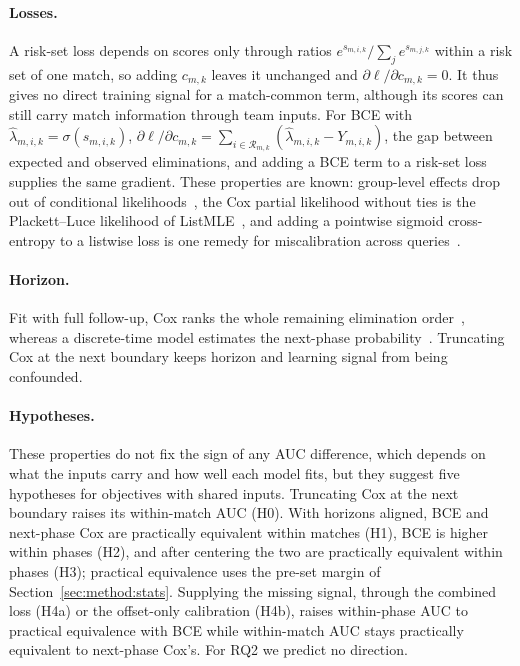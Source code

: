 \documentclass[sigconf,anonymous]{acmart}
\begin{document}
\paragraph{Losses.}
A risk-set loss depends on scores only through ratios $e^{s_{m,i,k}}/\sum_{j}e^{s_{m,j,k}}$ within a risk set of one match, so adding $c_{m,k}$ leaves it unchanged and $\partial\ell/\partial c_{m,k}=0$. It thus gives no direct training signal for a match-common term, although its scores can still carry match information through team inputs. For BCE with $\hat\lambda_{m,i,k}=\sigma(s_{m,i,k})$, $\partial\ell/\partial c_{m,k}=\sum_{i\in\mathcal{R}_{m,k}}(\hat\lambda_{m,i,k}-Y_{m,i,k})$, the gap between expected and observed eliminations, and adding a BCE term to a risk-set loss supplies the same gradient. These properties are known: group-level effects drop out of conditional likelihoods~\cite{Chamberlain80}, the Cox partial likelihood without ties is the Plackett--Luce likelihood of ListMLE~\cite{Xia08}, and adding a pointwise sigmoid cross-entropy to a listwise loss is one remedy for miscalibration across queries~\cite{Bai23}.

\paragraph{Horizon.}
Fit with full follow-up, Cox ranks the whole remaining elimination order~\cite{Cox72}, whereas a discrete-time model estimates the next-phase probability~\cite{SingerWillett93,Gensheimer19}. Truncating Cox at the next boundary keeps horizon and learning signal from being confounded.

\paragraph{Hypotheses.}
These properties do not fix the sign of any AUC difference, which depends on what the inputs carry and how well each model fits, but they suggest five hypotheses for objectives with shared inputs. Truncating Cox at the next boundary raises its within-match AUC (H0). With horizons aligned, BCE and next-phase Cox are practically equivalent within matches (H1), BCE is higher within phases (H2), and after centering the two are practically equivalent within phases (H3); practical equivalence uses the pre-set margin of Section~\ref{sec:method:stats}. Supplying the missing signal, through the combined loss (H4a) or the offset-only calibration (H4b), raises within-phase AUC to practical equivalence with BCE while within-match AUC stays practically equivalent to next-phase Cox's. For RQ2 we predict no direction.
\end{document}
